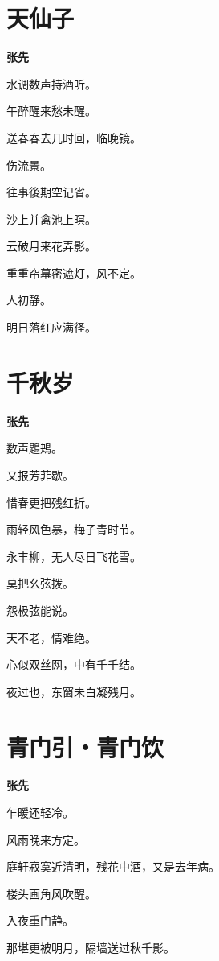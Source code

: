 \documentclass[12pt,a4paper]{ctexbook}
\begin{document}
\section{天仙子}
\textbf{张先}\par\vspace{0.5em}
水调数声持酒听。\par
午醉醒来愁未醒。\par
送春春去几时回，临晚镜。\par
伤流景。\par
往事後期空记省。\par
沙上并禽池上暝。\par
云破月来花弄影。\par
重重帘幕密遮灯，风不定。\par
人初静。\par
明日落红应满径。\par

\section{千秋岁}
\textbf{张先}\par\vspace{0.5em}
数声鶗鴂。\par
又报芳菲歇。\par
惜春更把残红折。\par
雨轻风色暴，梅子青时节。\par
永丰柳，无人尽日飞花雪。\par
莫把幺弦拨。\par
怨极弦能说。\par
天不老，情难绝。\par
心似双丝网，中有千千结。\par
夜过也，东窗未白凝残月。\par

\section{青门引・青门饮}
\textbf{张先}\par\vspace{0.5em}
乍暖还轻冷。\par
风雨晚来方定。\par
庭轩寂寞近清明，残花中酒，又是去年病。\par
楼头画角风吹醒。\par
入夜重门静。\par
那堪更被明月，隔墙送过秋千影。\par
\end{document}
